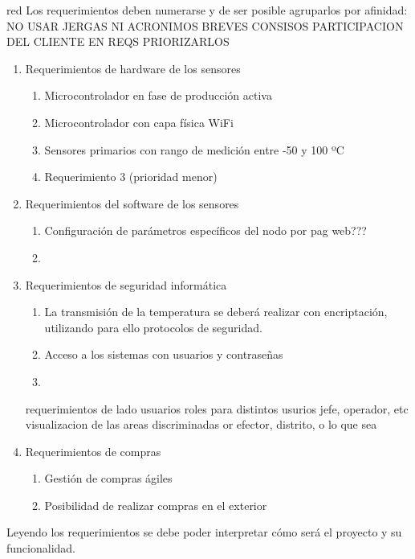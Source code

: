 \documentclass[11pt]{charter}
\begin{document}
\begin{consigna}{red}
Los requerimientos deben numerarse y de ser posible agruparlos por afinidad:
NO USAR JERGAS NI ACRONIMOS BREVES CONSISOS
PARTICIPACION DEL CLIENTE EN REQS
PRIORIZARLOS

\begin{enumerate}
\item Requerimientos de hardware de los sensores
	\begin{enumerate}
	\item Microcontrolador en fase de producción activa
	\item Microcontrolador con capa física WiFi	
	\item Sensores primarios con rango de medición entre -50 y 100 ºC

	\item Requerimiento 3 (prioridad menor)
	\end{enumerate}
\item Requerimientos del software de los sensores
	\begin{enumerate}
	\item Configuración de parámetros específicos del nodo por pag web???
	\item 

	\end{enumerate}	
\item Requerimientos de seguridad informática
	\begin{enumerate}
	\item La transmisión de la temperatura se deberá realizar con encriptación, utilizando para ello protocolos de seguridad.
	\item Acceso a los sistemas con usuarios y contraseñas
	\item 
	\end{enumerate}	
	requerimientos de lado usuarios
	roles para distintos usurios jefe, operador, etc
	visualizacion de las areas discriminadas or efector, distrito, o lo que sea
\item Requerimientos de compras
	\begin{enumerate}
	\item Gestión de compras ágiles 
	\item Posibilidad de realizar compras en el exterior
	\end{enumerate}
\end{enumerate}

Leyendo los requerimientos se debe poder interpretar cómo será el proyecto y su funcionalidad.


\end{consigna}
\end{document}
